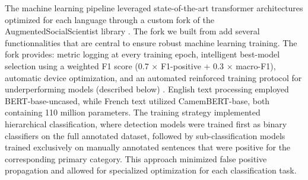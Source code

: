 The machine learning pipeline leveraged state-of-the-art transformer architectures optimized for each language through a custom fork of the AugmentedSocialScientist library \autocite{doAugmentedSocialScientist2022,lemorAntoinelemorAugmentedSocialScientistFork2025}. The fork we built from \textcite{doAugmentedSocialScientist2022} add several functionnalities that are central to ensure robust machine learning training. The fork provides: metric logging at every training epoch, intelligent best-model selection using a weighted F1 score (0.7 × F1-positive + 0.3 × macro-F1), automatic device optimization, and an automated reinforced training protocol for underperforming models (described below) \autocite{lemorAntoinelemorAugmentedSocialScientistFork2025}. English text processing employed BERT-base-uncased, while French text utilized CamemBERT-base, both containing 110 million parameters. The training strategy implemented hierarchical classification, where detection models were trained first as binary classifiers on the full annotated dataset, followed by sub-classification models trained exclusively on manually annotated sentences that were positive for the corresponding primary category. This approach minimized false positive propagation and allowed for specialized optimization for each classification task.

